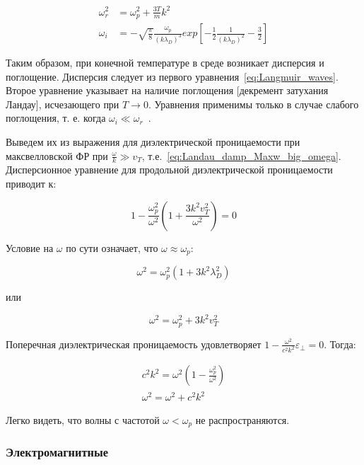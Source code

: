 \documentclass[10pt, a4paper]{article}
\begin{document}
\begin{align} \label{eq:Langmuir_waves}
	\omega_r^2 &= \omega_p^2 + \frac{3T}{m}k^2 \\
	\omega_i &= -\sqrt{\frac{\pi}{8}}\frac{\omega_p}{(k\lambda_D)^3} exp\left[-\frac{1}{2}\frac{1}{(k\lambda_D)^2}-\frac{3}{2}\right]
\end{align}

Таким образом, при конечной температуре в среде возникает дисперсия и поглощение. Дисперсия следует из первого уравнения~\eqref{eq:Langmuir_waves}. Второе уравнение указывает на наличие поглощения [декремент затухания Ландау], исчезающего при $T\rightarrow 0$. Уравнения применимы только в случае слабого поглощения, т. е. когда $\omega_i\ll\omega_r$~\cite{kroll}.

Выведем их из выражения для диэлектрической проницаемости при максвелловской ФР при $\frac{\omega}{k}\gg v_T$, т.е.~\eqref{eq:Landau_damp_Maxw_big_omega}. Дисперсионное уравнение для продольной диэлектрической проницаемости приводит к:

\begin{equation*}
	1 - \frac{\omega_p^2}{\omega^2}\left(1 + \frac{3k^2v_T^2}{\omega^2}\right) = 0
\end{equation*}

Условие на $\omega$ по сути означает, что $\omega\approx\omega_p$:

\begin{equation*}
	\omega^2 = \omega_p^2 (1+3k^2\lambda_D^2)
\end{equation*}

или

\begin{equation*}
	\omega^2 = \omega_p^2 + 3k^2v_T^2
\end{equation*}

Поперечная диэлектрическая проницаемость удовлетворяет $1-\frac{\omega^2}{c^2k^2}\varepsilon_\perp = 0$. Тогда:

\begin{align*}
	c^2k^2 = \omega^2\left(1 - \frac{\omega_p^2}{\omega^2}\right) \\
	\omega^2 = \omega^2 + c^2k^2
\end{align*}

Легко видеть, что волны с частотой $\omega<\omega_p$ не распространяются.

\subsubsection{Электромагнитные}
\end{document}
